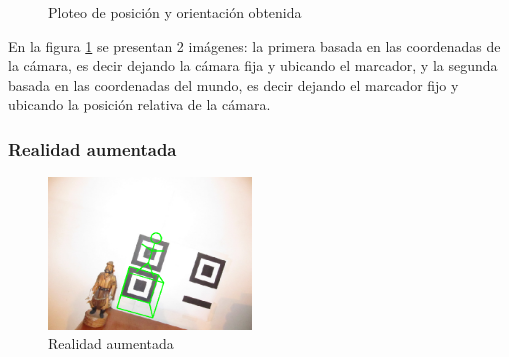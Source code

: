 \documentclass[main]{subfiles}
\begin{document}
\begin{figure}
  \begin{center}
  \end{center}
  \caption{Ploteo de posición y orientación obtenida}
  \label{fig:plots}  
\end{figure}

En la figura \ref{fig:plots} se presentan 2 imágenes: la primera basada en las coordenadas de la cámara, es decir dejando la cámara fija y ubicando el marcador, y la segunda basada en las coordenadas del mundo, es decir dejando el marcador fijo y ubicando la posición relativa de la cámara.

\newpage
\subsubsection*{Realidad aumentada}

\begin{figure}
	\begin{center}
	\vspace{-20pt}
		\includegraphics[width=0.48\textwidth]{./pics_camara/resultado_ar.png}
	\end{center}
	\caption{Realidad aumentada}
	\label{fig:resultado_ar}
\end{figure}
\end{document}
